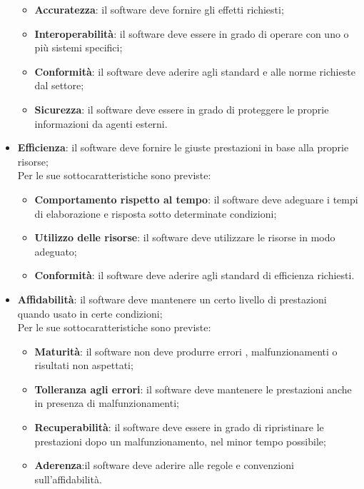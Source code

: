 \documentclass[../norme-di-progetto.tex]{subfiles}
\begin{document}
\begin{itemize}
\begin{itemize}
            \item \textbf{Accuratezza}: il software deve fornire gli effetti richiesti;
            \item \textbf{Interoperabilità}: il software deve essere in grado di operare con uno o più sistemi specifici;
            \item \textbf{Conformità}: il software deve aderire agli standard e alle norme richieste dal settore;
            \item \textbf{Sicurezza}: il software deve essere in grado di proteggere le proprie informazioni da agenti esterni.
        \end{itemize}
        \item \textbf{Efficienza}: il software deve fornire le giuste prestazioni in base alla proprie risorse;
        \\Per le sue sottocaratteristiche sono previste:
        \begin{itemize}
            \item \textbf{Comportamento rispetto al tempo}: il software deve adeguare i tempi di elaborazione e risposta sotto determinate condizioni;
            \item \textbf{Utilizzo delle risorse}: il software deve utilizzare le risorse in modo adeguato;
            \item \textbf{Conformità}: il software deve aderire agli standard di efficienza richiesti.
        \end{itemize}
        \item \textbf{Affidabilità}: il software deve mantenere un certo livello di prestazioni quando usato in certe condizioni;
        \\Per le sue sottocaratteristiche sono previste:
        \begin{itemize}
            \item \textbf{Maturità}: il software non deve produrre errori , malfunzionamenti o risultati non aspettati;
            \item \textbf{Tolleranza agli errori}: il software deve mantenere le prestazioni anche in presenza di malfunzionamenti;
            \item \textbf{Recuperabilità}: il software deve essere in grado di ripristinare le prestazioni dopo un malfunzionamento, nel minor tempo possibile;
            \item \textbf{Aderenza}:il software deve aderire alle regole e convenzioni sull'affidabilità.
        \end{itemize}

\end{itemize}
\end{document}
